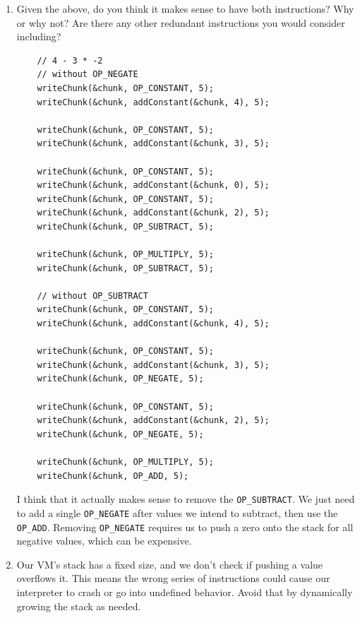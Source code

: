 \documentclass{article}
\begin{document}
\begin{enumerate}
{\begin{verbatim}
    writeChunk(&chunk, OP_CONSTANT, 4);
    writeChunk(&chunk, addConstant(&chunk, 5), 4);
    writeChunk(&chunk, OP_NEGATE, 4);

    writeChunk(&chunk, OP_DIVIDE, 4);
    writeChunk(&chunk, OP_SUBTRACT, 4);
        \end{verbatim}
    }

    \item {
        Given the above, do you think it makes sense to have both instructions? Why or why not? Are there any other redundant instructions you would consider including?

        \begin{verbatim}
    // 4 - 3 * -2
    // without OP_NEGATE
    writeChunk(&chunk, OP_CONSTANT, 5);
    writeChunk(&chunk, addConstant(&chunk, 4), 5);

    writeChunk(&chunk, OP_CONSTANT, 5);
    writeChunk(&chunk, addConstant(&chunk, 3), 5);

    writeChunk(&chunk, OP_CONSTANT, 5);
    writeChunk(&chunk, addConstant(&chunk, 0), 5);
    writeChunk(&chunk, OP_CONSTANT, 5);
    writeChunk(&chunk, addConstant(&chunk, 2), 5);
    writeChunk(&chunk, OP_SUBTRACT, 5);

    writeChunk(&chunk, OP_MULTIPLY, 5);
    writeChunk(&chunk, OP_SUBTRACT, 5);

    // without OP_SUBTRACT
    writeChunk(&chunk, OP_CONSTANT, 5);
    writeChunk(&chunk, addConstant(&chunk, 4), 5);

    writeChunk(&chunk, OP_CONSTANT, 5);
    writeChunk(&chunk, addConstant(&chunk, 3), 5);
    writeChunk(&chunk, OP_NEGATE, 5);

    writeChunk(&chunk, OP_CONSTANT, 5);
    writeChunk(&chunk, addConstant(&chunk, 2), 5);
    writeChunk(&chunk, OP_NEGATE, 5);

    writeChunk(&chunk, OP_MULTIPLY, 5);
    writeChunk(&chunk, OP_ADD, 5);
        \end{verbatim}

        I think that it actually makes sense to remove the \verb|OP_SUBTRACT|. 
        We just need to add a single \verb|OP_NEGATE| after values we intend to 
        subtract, then use the \verb|OP_ADD|. Removing \verb|OP_NEGATE| requires 
        us to push a zero onto the stack for all negative values, which can be 
        expensive.
    }

    \item {
        Our VM’s stack has a fixed size, and we don’t check if pushing a value overflows it. This means the wrong series of instructions could cause our interpreter to crash or go into undefined behavior. Avoid that by dynamically growing the stack as needed.

}
\end{enumerate}
\end{document}
